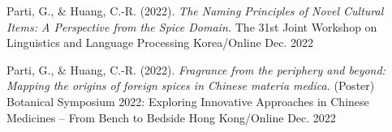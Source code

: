 
\begin{cventries}

  \cventry
    {Parti, G., \& Huang, C.-R. (2022). \textit{The Naming Principles of Novel Cultural Items: A Perspective from the Spice Domain.}} %
    {The 31st Joint Workshop on Linguistics and Language Processing \href{https://jwllp31.github.io/program/}{\faExternalLink}} %
    {Korea/Online} %
    {Dec. 2022} %
    {
    }


  \cventry
    {Parti, G., \& Huang, C.-R. (2022). \textit{Fragrance from the periphery and beyond: Mapping the origins of foreign spices in Chinese materia medica.} (Poster)} %
    {Botanical Symposium 2022: Exploring Innovative Approaches in Chinese Medicines -- From Bench to Bedside \href{https://event.fourwaves.com/botanicalsymposium2022/abstracts/1ea06222-f8a6-400c-8c92-de4e419a56f3}{\faExternalLink}} %
    {Hong Kong/Online} %
    {Dec. 2022} %
    {
    }

\end{cventries}
